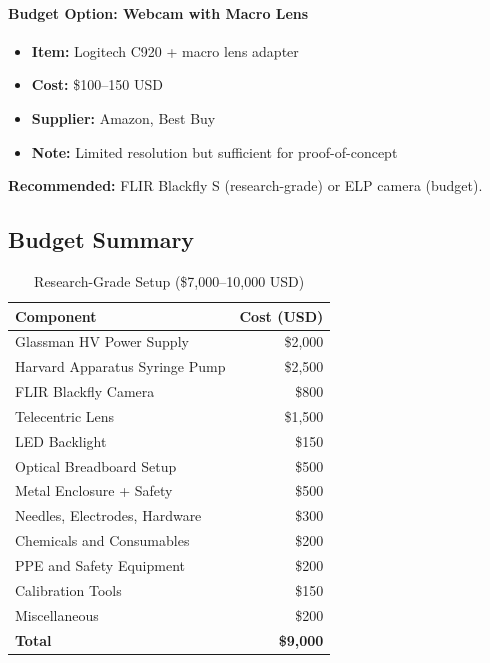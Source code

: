 \documentclass[11pt]{article}
\begin{document}
\paragraph{Budget Option: Webcam with Macro Lens}

\begin{itemize}
\item \textbf{Item:} Logitech C920 + macro lens adapter
\item \textbf{Cost:} \$100--150 USD
\item \textbf{Supplier:} Amazon, Best Buy
\item \textbf{Note:} Limited resolution but sufficient for proof-of-concept
\end{itemize}

\textbf{Recommended:} FLIR Blackfly S (research-grade) or ELP camera (budget).

\subsection{Budget Summary}

\begin{table}[H]
\centering
\caption{Research-Grade Setup (\$7,000--10,000 USD)}
\small
\begin{tabular}{lr}
\toprule
Component & Cost (USD) \\
\midrule
Glassman HV Power Supply & \$2,000 \\
Harvard Apparatus Syringe Pump & \$2,500 \\
FLIR Blackfly Camera & \$800 \\
Telecentric Lens & \$1,500 \\
LED Backlight & \$150 \\
Optical Breadboard Setup & \$500 \\
Metal Enclosure + Safety & \$500 \\
Needles, Electrodes, Hardware & \$300 \\
Chemicals and Consumables & \$200 \\
PPE and Safety Equipment & \$200 \\
Calibration Tools & \$150 \\
Miscellaneous & \$200 \\
\midrule
\textbf{Total} & \textbf{\$9,000} \\
\bottomrule
\end{tabular}
\end{table}
\end{document}
